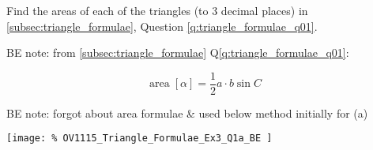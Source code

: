 \question Find the areas of each of the triangles (to 3 decimal places) in 
\ref{subsec:triangle_formulae}, Question \ref{q:triangle_formulae_q01}.

BE note: from \ref{subsec:triangle_formulae} Q\ref{q:triangle_formulae_q01}:
\begin{multicols}{3}
\end{multicols}
\begin{solution}
	\[
		\text{area} \; [\alpha] = \frac{1}{2} a \cdot b \sin{C}
	\]
	\begin{multicols}{3}
		\setlength{\columnseprule}{0.4pt}
	\end{multicols}

	BE note: forgot about area formulae \& used below method initially for (a)
	\par
	\begin{center}
		\texttt{[image: \%
			OV1115\_Triangle\_Formulae\_Ex3\_Q1a\_BE
		]}
	\end{center}
\end{solution}

